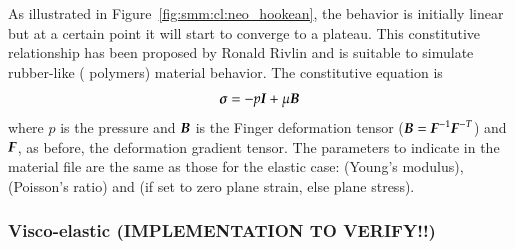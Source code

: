 As illustrated in Figure~\ref{fig:smm:cl:neo_hookean}, the behavior is initially
linear but at a certain point it will start to converge to a plateau.  This
constitutive relationship has been proposed by Ronald
Rivlin\cite{ronald-neohooken} and is suitable to simulate rubber-like (\eg
polymers) material behavior. The constitutive equation is
\begin{equation}
  \boldsymbol{\sigma } = -p \boldsymbol{I} + \mu \boldsymbol{B}
\end{equation}
where $p$ is the pressure and $\boldsymbol{B}$ is the Finger deformation tensor
($\boldsymbol{B}=\boldsymbol{F}^{-1}\boldsymbol{F}^{-T}$) and $\boldsymbol{F}$, as before, the deformation
gradient tensor.  The parameters to indicate in the material file are the same
as those for the elastic case:  (Young's modulus),  (Poisson's
ratio) and  (if set to zero plane strain, else plane
stress).

\subsubsection{Visco-elastic (IMPLEMENTATION TO VERIFY!!)}

